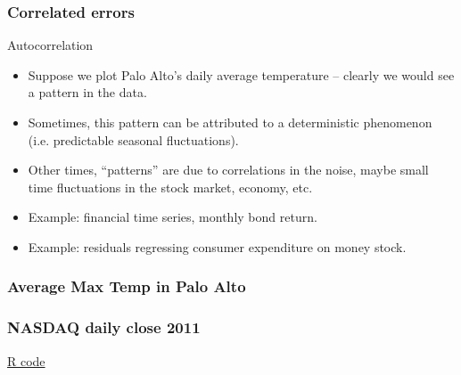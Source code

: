 \documentclass[handout]{beamer}
\begin{document}
   \begin{frame} \frametitle{Correlated errors}

   \begin{block}
   {Autocorrelation                     }
   \begin{itemize}

   \item Suppose we plot Palo Alto's daily average temperature --
   clearly we would see a pattern in the data.
   \item Sometimes, this pattern can be attributed to a deterministic
   phenomenon (i.e. predictable seasonal fluctuations).

   \item Other times, ``patterns'' are due to correlations in the noise, maybe small time fluctuations in the stock market, economy, etc.



   \item Example: financial time series, monthly bond return.

   \item Example: residuals regressing consumer expenditure on money stock.
   \end{itemize}
   \end{block}
   \end{frame}



   \begin{frame}
   \frametitle{Average Max Temp in Palo Alto}
   \begin{center}
   \end{center}

   \end{frame}



   \begin{frame}
   \frametitle{NASDAQ daily close 2011}
   \begin{center}
   \end{center}
   \href{http://stats191.stanford.edu/correlated_errors.html#nasdag}{R code}
   \end{frame}
\end{document}
